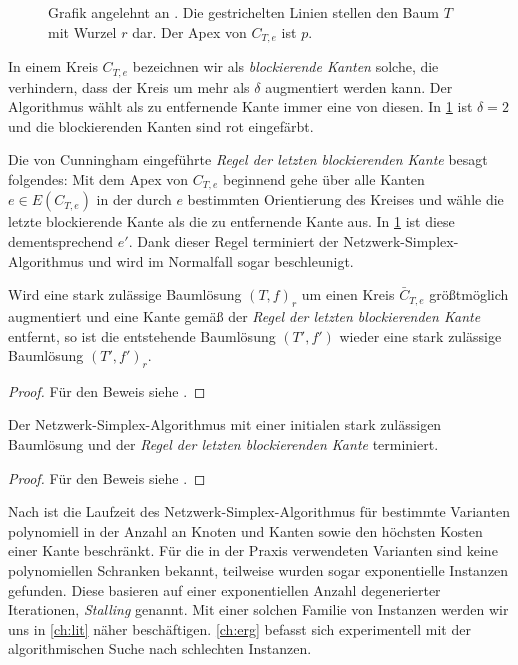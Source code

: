 \begin{figure}[!ht]\centering
    
    \caption{Grafik angelehnt an \cite[S. 372]{GNA}. Die gestrichelten Linien stellen den Baum $T$ mit Wurzel $r$ dar. Der Apex von $C_{T,e}$ ist $p$.}
    \label{fig:rule}
\end{figure}

In einem Kreis $C_{T,e}$ bezeichnen wir als \emph{blockierende Kanten} solche, die verhindern, dass der Kreis um mehr als $\delta$ augmentiert werden kann. Der Algorithmus wählt als zu entfernende Kante immer eine von diesen. In \cref{fig:rule} ist $\delta=2$ und die blockierenden Kanten sind rot eingefärbt.

Die von Cunningham eingeführte \emph{Regel der letzten blockierenden Kante} besagt folgendes: Mit dem Apex von $C_{T,e}$ beginnend gehe über alle Kanten $e\in E(C_{T,e})$ in der durch $e$ bestimmten Orientierung des Kreises und wähle die letzte blockierende Kante als die zu entfernende Kante aus. In \cref{fig:rule} ist diese dementsprechend $e'$. Dank dieser Regel terminiert der Netzwerk-Simplex-Algorithmus und wird im Normalfall sogar beschleunigt. 
 
\begin{lem}
Wird eine stark zulässige Baumlösung $(T,f)_r$ um einen Kreis $\bar{C}_{T,e}$ größtmöglich augmentiert und eine Kante gemäß  der \emph{Regel der letzten blockierenden Kante} entfernt, so ist die entstehende Baumlösung $(T',f')$ wieder eine stark zulässige Baumlösung $(T',f')_r$.\end{lem}
\begin{proof}Für den Beweis siehe \cite[S. 108\,f.]{cycling}. 
\end{proof}

\begin{thm}
Der Netzwerk-Simplex-Algorithmus mit einer initialen stark zulässigen Baumlösung und der \emph{Regel der letzten blockierenden Kante} terminiert.\end{thm}
\begin{proof}Für den Beweis siehe \cite[S. 108\,f.]{cycling}. 
\end{proof}

Nach \cite[S. 359]{GNA} ist die Laufzeit des Netzwerk-Simplex-Algorithmus für bestimmte Varianten polynomiell in der Anzahl an Knoten und Kanten sowie den höchsten Kosten einer Kante beschränkt. Für die in der Praxis verwendeten Varianten sind keine polynomiellen Schranken bekannt, teilweise wurden sogar exponentielle Instanzen gefunden. Diese basieren auf einer exponentiellen Anzahl degenerierter Iterationen, \emph{Stalling} genannt. Mit einer solchen Familie von Instanzen werden wir uns in \cref{ch:lit} näher beschäftigen. \cref{ch:erg} befasst sich experimentell mit der algorithmischen Suche nach schlechten Instanzen.

